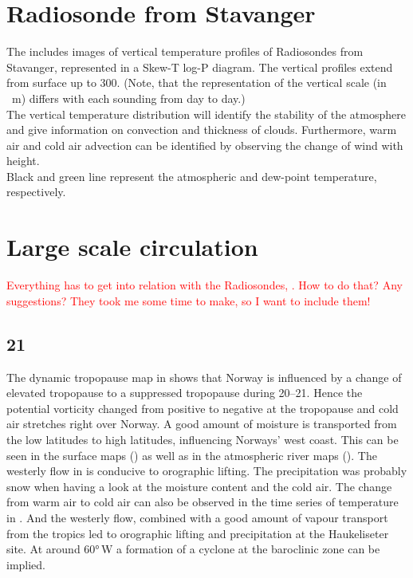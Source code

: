 \section{Radiosonde from Stavanger} \label{sec:Radiosonde}
The  includes images of vertical temperature profiles of Radiosondes from Stavanger, represented in a Skew-T log-P diagram. The vertical profiles extend from surface up to \SI{300}{\hPa}. (Note, that the representation of the vertical scale (in \SI{}{\metre}) differs with each sounding from day to day.)
\\
The vertical temperature distribution will identify the stability of the atmosphere and give information on convection and thickness of clouds. Furthermore, warm air and cold air advection can be identified by observing the change of wind with height.
\\
Black and green line represent the atmospheric and dew-point temperature, respectively.

\section{Large scale circulation} \label{sec:largeScale}
\textcolor{red}{Everything has to get into relation with the Radiosondes, . How to do that? Any suggestions? They took me some time to make, so I want to include them!}
\subsection*{\SI{21}{\dec}}
The dynamic tropopause map in  shows that Norway is influenced by a change of elevated tropopause to a suppressed tropopause during \SIrange{20}{21}{\dec}. Hence the potential vorticity changed from positive to negative at the tropopause and cold air stretches right over Norway.
A good amount of moisture is transported from the low latitudes to high latitudes, influencing Norways' west coast. This can be seen in the surface maps () as well as in the atmospheric river maps (). The westerly flow in  is conducive to orographic lifting. The precipitation was probably snow when having a look at the moisture content and the cold air. The change from warm air to cold air can also be observed in the time series of temperature in . And the westerly flow, combined with a good amount of vapour transport from the tropics led to orographic lifting and precipitation at the Haukeliseter site. 
At around \ang{60}{\,W} a formation of a cyclone at the baroclinic zone can be implied.  

